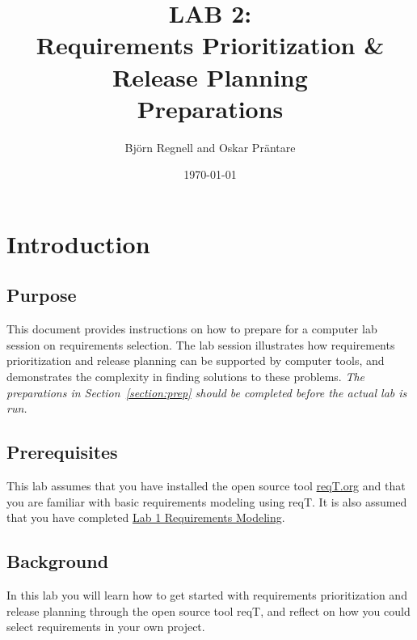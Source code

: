 \documentclass[11pt]{article}
\title{{\bf LAB 2:\\Requirements Prioritization \& Release Planning}\\ Preparations %
}
\author{Björn Regnell and Oskar Präntare}
\date{\today}
\begin{document}
\maketitle

\section{Introduction}

\subsection{Purpose} This document provides instructions on how to prepare for 
a computer lab session on requirements selection. The lab session illustrates how requirements prioritization and release planning can be supported by computer tools, and demonstrates the complexity in finding solutions to these problems. {\it The preparations in Section~\ref{section:prep} should be completed before the actual lab is run.} 

\subsection{Prerequisites} This lab assumes that you have installed the open source tool \href{http://reqT.org}{reqT.org} and that you are familiar with basic requirements modeling using reqT. It is also assumed that you have completed \href{https://github.com/reqT/reqT/blob/3.0.x/doc/lab1/lab1.pdf}{Lab 1 Requirements Modeling}.

\subsection{Background} In this lab you will learn how to get started with requirements prioritization and release planning through the open source tool reqT, and reflect on how you could select requirements in your own project. 
\end{document}
